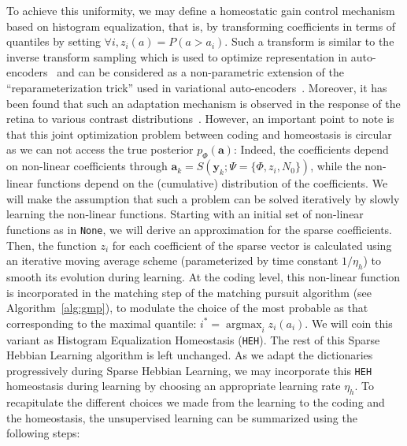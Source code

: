 \documentclass[vision,article,submit,oneauthor,pdftex]{Definitions/mdpi}
\DeclareMathOperator*{\ArgMax}{\arg\max}   %
\newcommand{\coef}{\mathbf{a}} %
\newcommand{\image}{\mathbf{y}} %
\newcommand{\dico}{\Phi} %
\begin{document}
To achieve this uniformity, we may define a homeostatic gain control mechanism based on histogram equalization, that is, by transforming coefficients in terms of quantiles by setting $\forall i, z_i( a ) = P( a > a_i)$. Such a transform is similar to the inverse transform sampling which is used to optimize representation in auto-encoders~\citep{Doersch2016} and can be considered as a non-parametric extension of the ``reparameterization trick'' used in variational auto-encoders~\citep{Kingma13}. %
Moreover, it has been found that such an adaptation mechanism is observed in the response of the retina to various contrast distributions~\citep{Laughlin81}. However, an important point to note is that this joint optimization problem between coding and homeostasis is circular as we can not access the true posterior $p_\dico(\coef)$: Indeed, the coefficients depend on non-linear coefficients through $\coef_{k} = S(\image_k; \Psi=\{\dico, z_i, N_0\})$, while the non-linear functions depend on the (cumulative) distribution of the coefficients. We will make the assumption that such a problem can be solved iteratively by slowly learning the non-linear functions. Starting with an initial set of non-linear functions as in \texttt{None}, we will derive an approximation for the sparse coefficients. Then, the function $z_i$ for each coefficient of the sparse vector is calculated using an iterative moving average scheme (parameterized by time constant $1/\eta_h$) to smooth its evolution during learning. At the coding level, this non-linear function is incorporated in the matching step of the matching pursuit algorithm (see Algorithm~\ref{alg:gmp}), to modulate the choice of the most probable as that corresponding to the maximal quantile: $i^\ast = \ArgMax_i z_i(a_i)$. We will coin this variant as Histogram Equalization Homeostasis (\texttt{HEH}). The rest of this Sparse Hebbian Learning algorithm is left unchanged. As we adapt the dictionaries progressively during Sparse Hebbian Learning, we may incorporate this \texttt{HEH} homeostasis during learning by choosing an appropriate learning rate $\eta_h$.
To recapitulate the different choices we made from the learning to the coding and the homeostasis, the unsupervised learning can be summarized using the following steps:
\end{document}
